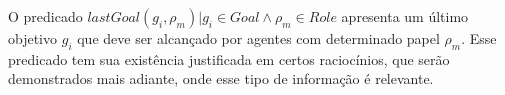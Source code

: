 O predicado $lastGoal(g_i,\rho_m) | g_i \in Goal \wedge \rho_m \in Role $ apresenta um último objetivo $g_i$ que deve ser alcançado por agentes com determinado papel $\rho_{m}$. Esse predicado tem sua existência justificada em certos raciocínios, que serão demonstrados mais adiante, onde esse tipo de informação é relevante.